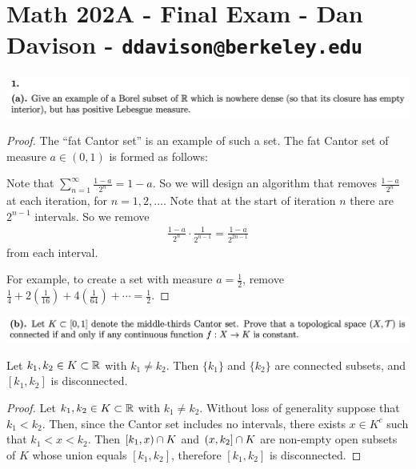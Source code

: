 \section*{Math 202A - Final Exam - Dan Davison - \texttt{ddavison@berkeley.edu}}

\begin{mdframed}
  \includegraphics[width=400pt]{img/analysis--berkeley-202a-final-c9d2.png}
\end{mdframed}

\begin{proof}
  The ``fat Cantor set​'' is an example of such a set. The fat Cantor set of measure $a \in (0, 1)$ is formed as
  follows:

  Note that $\sum_{n=1}^\infty \frac{1 - a}{2^n} = 1 - a$. So we will design an algorithm that
  removes $\frac{1-a}{2^n}$ at each iteration, for $n=1, 2, \ldots$. Note that at the start of iteration $n$
  there are $2^{n-1}$ intervals. So we remove
  \begin{align*}
    \frac{1-a}{2^{n}}\cdot\frac{1}{2^{n-1}} = \frac{1 - a}{2^{2n - 1}}
  \end{align*}
  from each interval.

  For example, to create a set with measure $a = \frac{1}{2}$,
  remove $\frac{1}{4} + 2(\frac{1}{16}) + 4(\frac{1}{64}) + \cdots = \frac{1}{2}$.
\end{proof}

\begin{mdframed}
  \includegraphics[width=400pt]{img/analysis--berkeley-202a-final-4333.png}
\end{mdframed}

\begin{lemma}\label{cantor-set-totally-disconnected}
  Let $k_1, k_2 \in K \subset \mathbb{R}$ with $k_1 \neq k_2$. Then $\{k_1\}$ and $\{k_2\}$ are connected subsets,
  and $[k_1, k_2]$ is disconnected.
\end{lemma}

\begin{proof}
  Let $k_1, k_2 \in K \subset \mathbb{R}$ with $k_1 \neq k_2$. Without loss of generality suppose
  that $k_1 < k_2$. Then, since the Cantor set includes no intervals, there exists $x \in K^c$ such
  that $k_1 < x < k_2$. Then $[k_1, x) \cap K$ and $(x, k_2] \cap K$ are non-empty open subsets
  of $K$ whose union equals $[k_1, k_2]$, therefore $[k_1, k_2]$ is disconnected.
\end{proof}

